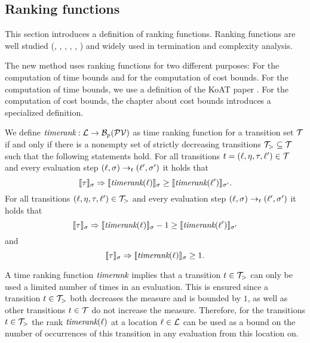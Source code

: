 \subsection{Ranking functions}

This section introduces a definition of ranking functions.
Ranking functions are well studied (\cite{bradley2005polyranking}, \cite{podelski2004prf}, \cite{bradley2005linear}, \cite{bagnara2012new}, \cite{leike2014ranking}, \cite{ben2013linear}) and widely used in termination and complexity analysis.

The new method uses ranking functions for two different purposes:
For the computation of time bounds and for the computation of cost bounds.
For the computation of time bounds, we use a definition of the KoAT paper \cite{koat}.
For the computation of cost bounds, the chapter about cost bounds introduces a specialized definition.

\begin{definition} 
  We define $\emph{timerank}: \mathcal{L} \rightarrow \mathcal{B}_p(\mathcal{PV})$ as time ranking function for a transition set $\mathcal{T}$ if and only if there is a nonempty set of strictly decreasing transitions $\mathcal{T}_{>} \subseteq \mathcal{T}$ such that the following statements hold.
  For all transitions $t = (\ell, \eta, \tau, \ell') \in \mathcal{T}$ and every evaluation step $(\ell, \sigma) \rightarrow_t (\ell', \sigma')$ it holds that
  \[ \llbracket \tau \rrbracket_{\sigma} \Rightarrow \llbracket \emph{timerank}(\ell) \rrbracket_{\sigma} \geq \llbracket \emph{timerank}(\ell') \rrbracket_{\sigma'}. \]
  For all transitions $(\ell, \eta, \tau, \ell') \in \mathcal{T}_{>}$ and every evaluation step $(\ell, \sigma) \rightarrow_t (\ell', \sigma')$ it holds that        
  \[ \llbracket \tau \rrbracket_{\sigma} \Rightarrow \llbracket \emph{timerank}(\ell) \rrbracket_{\sigma} - 1 \geq \llbracket \emph{timerank}(\ell') \rrbracket_{\sigma'} \]
  and
  \[ \llbracket \tau \rrbracket_{\sigma} \Rightarrow \llbracket \emph{timerank}(\ell) \rrbracket_{\sigma} \geq 1. \]
\end{definition}

A time ranking function $\emph{timerank}$ implies that a transition $t \in \mathcal{T}_>$ can only be used a limited number of times in an evaluation.
This is ensured since a transition $t \in \mathcal{T}_>$ both decreases the measure and is bounded by $1$, as well as other transitions $t \in \mathcal{T}$ do not increase the measure.
Therefore, for the transitions $t \in \mathcal{T}_>$ the rank $\emph{timerank}(\ell)$ at a location $\ell \in \mathcal{L}$ can be used as a bound on the number of occurrences of this transition in any evaluation from this location on.

